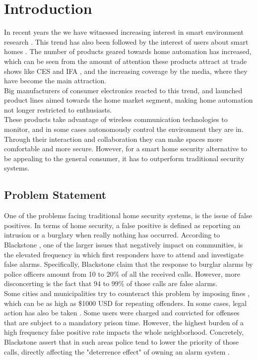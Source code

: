 \chapter{Introduction}
\label{chapter:Introduction}
In recent years the we have witnessed increasing interest in smart environment research \cite{1010072F1159031611}. This trend has also been followed by the interest of users about smart homes \cite{googletrends}. The number of products geared towards home automation has increased, which can be seen from the amount of attention these products attract at trade shows like CES \cite{cnet} and IFA \cite{cnetIFA}, and the increasing coverage by the media, where they have become the main attraction. \\
Big manufacturers of consumer electronics reacted to this trend, and launched product lines aimed towards the home market segment, making home automation not longer restricted to enthusiasts.\\
These products take advantage of wireless communication technologies to monitor, and in some cases autonomously control the environment they are in. Through their interaction and collaboration they can make spaces more comfortable and more secure. However, for a smart home security alternative to be appealing to the general consumer, it has to outperform traditional security systems. 

\section{Problem Statement}
One of the problems facing traditional home security systems, is the issue of false positives. In terms of home security, a false positive is defined as reporting an intrusion or a burglary when really nothing has occurred. According to Blackstone \etAl \cite{Blackstone2005233}, one of the larger issues that negatively impact on communities, is the elevated frequency in which first responders have to attend and investigate false alarms. Specifically, Blackstone \etAl claim that the response to burglar alarms by police officers amount from 10 to 20\% of all the received calls. However, more disconcerting is the fact that 94 to 99\% of those calls are false alarms. \\
Some cities and municipalities try to counteract this problem by imposing fines \cite{Blackstone2005233}, which can be as high as \$1000 USD for repeating offenders. In some cases, legal action has also be taken \cite{Blackstone2005233}. Some users were charged and convicted for offenses that are subject to a mandatory prison time. However, the highest burden of a high frequency false positive rate impacts the whole neighborhood. Concretely, Blackstone \etAl assert that in such areas police tend to lower the priority of those calls, directly affecting the "deterrence effect" of owning an alarm system \cite{Blackstone2005233}. 
\\

